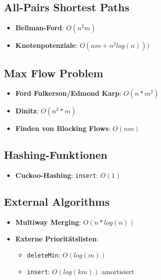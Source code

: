 \documentclass[10pt,a4paper]{article}
\begin{document}
	\subsection{All-Pairs Shortest Paths}
	\label{lz:sub:all_pairs_shortest_paths}
	
	\begin{itemize}
		\item \textbf{Bellman-Ford}: $O(n^2m)$
		\item \textbf{Knotenpotenziale}: $O(nm + n^2log(n)))$
	\end{itemize}

	\subsection{Max Flow Problem}
	\label{lz:sub:max_flow_problem}
	
	\begin{itemize}
		\item \textbf{Ford Fulkerson/Edmond Karp}: $O(n * m^2)$
		\item \textbf{Dinitz}: $O(n^2 * m)$
		\item \textbf{Finden von Blocking Flows}: $O(nm)$
	\end{itemize}

	\subsection{Hashing-Funktionen}
	\label{lz:sub:hashing_funktionen}
	
	\begin{itemize}
		\item \textbf{Cuckoo-Hashing}: \texttt{insert}: $O(1)$
	\end{itemize}

	\subsection{External Algorithms}
	\label{lz:sub:external_algorithms}
	
	\begin{itemize}
		\item \textbf{Multiway Merging}: $O(n * log (n))$
		\item \textbf{Externe Prioritätslisten}:
		\begin{itemize}
			\item \texttt{deleteMin}: $O(log (m))$
			\item \texttt{insert}: $O(log (km))$ amortisiert
		\end{itemize}
	\end{itemize}
\end{document}
